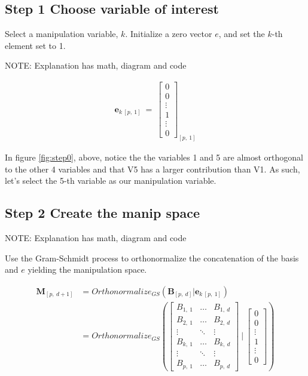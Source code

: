 \documentclass{monashthesis}
\begin{document}
\hypertarget{step-1-choose-variable-of-interest}{%
\subsection{Step 1 Choose variable of interest}\label{step-1-choose-variable-of-interest}}

Select a manipulation variable, \(k\). Initialize a zero vector \(e\), and set the \(k\)-th element set to 1.

NOTE: Explanation has math, diagram and code

\begin{align*}
\textbf{e}_{k~[p,~1]} ~=~ 
  \begin{bmatrix}
    0 \\
    0 \\
    \vdots \\
    1 \\
    \vdots \\
    0
  \end{bmatrix}_{[p,~1]}
\end{align*}

In figure \ref{fig:step0}, above, notice the the variables 1 and 5 are almost orthogonal to the other 4 variables and that V5 has a larger contribution than V1. As such, let's select the 5-th variable as our manipulation variable.

\hypertarget{step-2-create-the-manip-space}{%
\subsection{Step 2 Create the manip space}\label{step-2-create-the-manip-space}}

NOTE: Explanation has math, diagram and code

Use the Gram-Schmidt process to orthonormalize the concatenation of the basis and \(e\) yielding the manipulation space.

\begin{align*}
  \textbf{M}_{[p,~d+1]}
  &= Orthonormalize_{GS}( \textbf{B}_{[p,~d]}|\textbf{e}_{k~[p,~1]} ) \\
  &= Orthonormalize_{GS}
  \left(
    \begin{bmatrix}
      B_{1,~1} & \dots  & B_{1,~d} \\
      B_{2,~1} & \dots  & B_{2,~d} \\
      \vdots   & \ddots & \vdots   \\
      B_{k,~1} & \dots  & B_{k,~d} \\
      \vdots   & \ddots & \vdots   \\
      B_{p,~1} & \dots  & B_{p,~d}
    \end{bmatrix}
  ~|~
    \begin{bmatrix}
      0 \\
      0 \\
      \vdots \\
      1 \\
      \vdots \\
      0
    \end{bmatrix}
  \right)
\end{align*}
\end{document}
